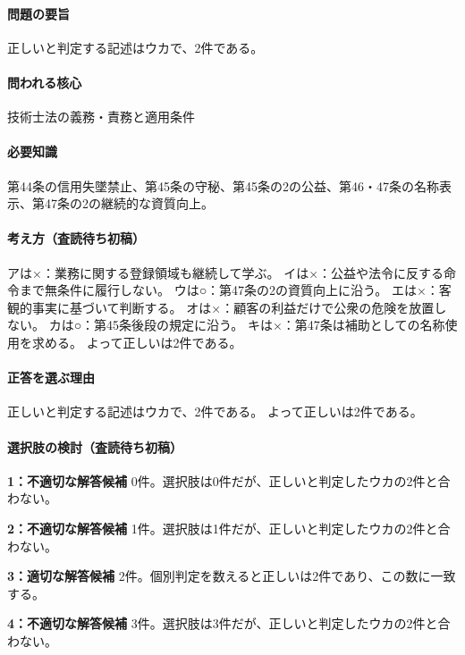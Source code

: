 \paragraph{問題の要旨} 正しいと判定する記述はウカで、2件である。

\paragraph{問われる核心} 技術士法の義務・責務と適用条件

\paragraph{必要知識} 第44条の信用失墜禁止、第45条の守秘、第45条の2の公益、第46・47条の名称表示、第47条の2の継続的な資質向上。

\paragraph{考え方（査読待ち初稿）} アは×：業務に関する登録領域も継続して学ぶ。 イは×：公益や法令に反する命令まで無条件に履行しない。 ウは○：第47条の2の資質向上に沿う。 エは×：客観的事実に基づいて判断する。 オは×：顧客の利益だけで公衆の危険を放置しない。 カは○：第45条後段の規定に沿う。 キは×：第47条は補助としての名称使用を求める。 よって正しいは2件である。

\paragraph{正答を選ぶ理由} 正しいと判定する記述はウカで、2件である。  よって正しいは2件である。

\paragraph{選択肢の検討（査読待ち初稿）}\mbox{}\par

\noindent\textbf{1：不適切な解答候補} 0件。選択肢は0件だが、正しいと判定したウカの2件と合わない。\par

\noindent\textbf{2：不適切な解答候補} 1件。選択肢は1件だが、正しいと判定したウカの2件と合わない。\par

\noindent\textbf{3：適切な解答候補} 2件。個別判定を数えると正しいは2件であり、この数に一致する。\par

\noindent\textbf{4：不適切な解答候補} 3件。選択肢は3件だが、正しいと判定したウカの2件と合わない。\par

